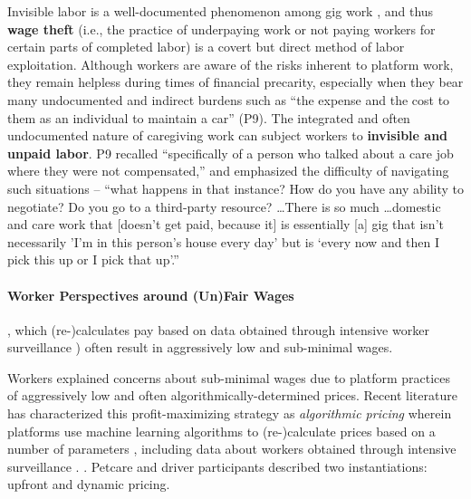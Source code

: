 {Invisible labor is a well-documented phenomenon among gig work \cite{gray2019ghost,QNoU,disability,9Fa7}, and thus \textbf{wage theft} (i.e., the practice of underpaying work or not paying workers for certain parts of completed labor) is a covert but direct {method of labor exploitation}. 
Although workers are aware of the risks inherent to platform work, they remain helpless during times of financial precarity, especially when they bear many undocumented and indirect burdens such as ``the expense and the cost to them as an individual to maintain a car'' (P9). 
The integrated and often undocumented nature of caregiving work can subject workers to \textbf{invisible and unpaid labor}. P9 recalled ``specifically of a person who talked about a care job where they were not compensated,'' and emphasized the difficulty of navigating such situations – ``what happens in that instance? How do you have any ability to negotiate? Do you go to a third-party resource? \dots There is so much \dots domestic and care work that {[doesn't get paid, because it]} is essentially [a] gig that isn't necessarily 'I'm in this person's house every day' but is ‘every now and then I pick this up or I pick that up'.'' 

\paragraph{Worker Perspectives around (Un)Fair Wages}, which (re-)calculates pay based on data obtained through intensive worker surveillance \cite{dubal2023algorithmic, teachout2023algorithmic}) often result in aggressively low and sub-minimal wages.
}{Workers explained concerns about sub-minimal wages due to platform practices of aggressively low and often algorithmically-determined prices. 
Recent literature has characterized this profit-maximizing strategy \cite{dubal2023algorithmic} as \textit{algorithmic pricing} wherein {platforms use machine learning algorithms to (re-)calculate prices based on a number of parameters \cite{kloostra2022algorithmic, pignot2023pulling}, including data about workers obtained through intensive surveillance \cite{dubal2023algorithmic, teachout2023algorithmic}}. 
}
. Petcare and driver participants described two {instantiations}: upfront and dynamic pricing. %

